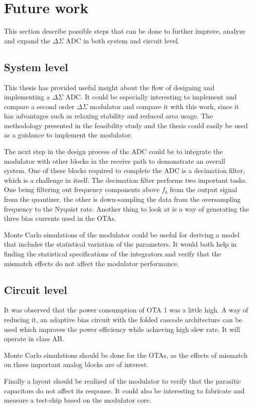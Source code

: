 \section{Future work}
This section describe possible steps that can be done to further improve, analyze and expand the $\Delta\Sigma$ ADC in both system and circuit level. 

\subsection{System level}
This thesis has provided useful insight about the flow of designing and implementing a $\Delta\Sigma$ ADC. It could be especially interesting to implement and compare a second order $\Delta\Sigma$ modulator and compare it with this work, since it has advantages such as relaxing stability and reduced area usage. The methodology presented in the feasibility study and the thesis could easily be used as a guidance to implement the modulator. 

The next step in the design process of the ADC could be to integrate the modulator with other blocks in the receive path to demonstrate an overall system. One of these blocks required to complete the ADC is a decimation filter, which is a challenge in itself. The decimation filter performs two important tasks. One being filtering out frequency components above $f_b$ from the output signal from the quantizer, the other is down-sampling the data from the oversampling frequency to the Nyquist rate. Another thing to look at is a way of generating the three bias currents used in the OTAs. 

Monte Carlo simulations of the modulator could be useful for deriving a model that includes the statistical variation of the parameters. It would both help in finding the statistical specifications of the integrators and verify that the mismatch effects do not affect the modulator performance. 

\subsection{Circuit level}

It was observed that the power consumption of OTA 1 was a little high. A way of reducing it, an adaptive bias circuit with the folded cascode architecture can be used which improves the power efficiency while achieving high slew rate. It will operate in class AB. 

Monte Carlo simulations should be done for the OTAs, as the effects of mismatch on these important analog blocks are of interest.

Finally a layout should be realized of the modulator to verify that the parasitic capacitors do not affect its response. It could also be interesting to fabricate and measure a test-chip based on the modulator core.
